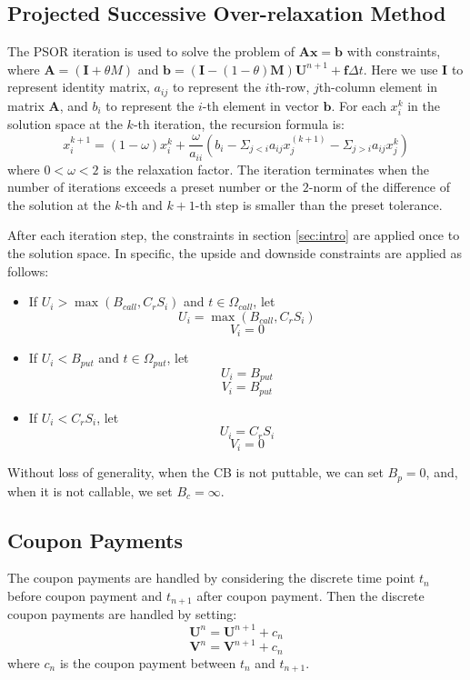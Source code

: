\documentclass[12pt]{article}
\begin{document}
\subsection{Projected Successive Over-relaxation Method}
The PSOR iteration is used to solve the problem of $\mathbf{Ax} = \mathbf{b}$ with constraints, where $\mathbf{A} = (\mathbf{I} + \theta M)$ and $ \mathbf{b} = (\mathbf{I} - (1-\theta)\mathbf{M})\mathbf{U}^{n+1} + \mathbf{f}\Delta t$. Here we use $\mathbf{I}$ to represent identity matrix, $a_{ij}$ to represent the $i$th-row, $j$th-column element in matrix $\mathbf{A}$, and $b_i$ to represent the $i$-th element in vector $\mathbf{b}$. For each $x^k_i$ in the solution space at the $k$-th iteration, the recursion formula is:
\begin{equation}
x_i^{k+1} = (1-\omega)x_i^{k} + \frac{\omega}{a_{ii}}(b_i - \Sigma_{j < i} a_{ij}x_{j}^{(k+1)} - \Sigma_{j > i}a_{ij}x_j^{k})
\end{equation}
where $0< \omega < 2$ is the relaxation factor. The iteration terminates when the number of iterations exceeds a preset number or the $2$-norm of the difference of the solution at the $k$-th and $k+1$-th step is smaller than the preset tolerance.

After each iteration step, the constraints in section \ref{sec:intro} are applied once to the solution space. In specific, the upside and downside constraints are applied as follows:
\begin{itemize}
\item
If $U_i > \max(B_{call}, C_rS_i)$ and $t\in \Omega_{call}$, let
\[U_i = \max(B_{call}, C_rS_i)\]
\[V_i = 0\]
\item
If $U_i < B_{put}$ and $t\in \Omega_{put}$, let
\[U_i = B_{put}\]
\[V_i = B_{put}\]
\item
If $U_i < C_rS_i$, let
\[U_i = C_rS_i\]
\[V_i = 0\]
\end{itemize}
Without loss of generality, when the CB is not puttable, we can set $B_p = 0$, and, when it is not callable, we set $B_c = \infty$. 

\subsection{Coupon Payments}
The coupon payments are handled by considering the discrete time point $t_n$ before coupon payment and $t_{n+1}$ after coupon payment. Then the discrete coupon payments are handled by setting:
\[\mathbf{U}^n = \mathbf{U}^{n+1} + c_n\] 
\[\mathbf{V}^n = \mathbf{V}^{n+1} + c_n\]
where $c_n$ is the coupon payment between $t_n$ and $t_{n+1}$.
\end{document}
